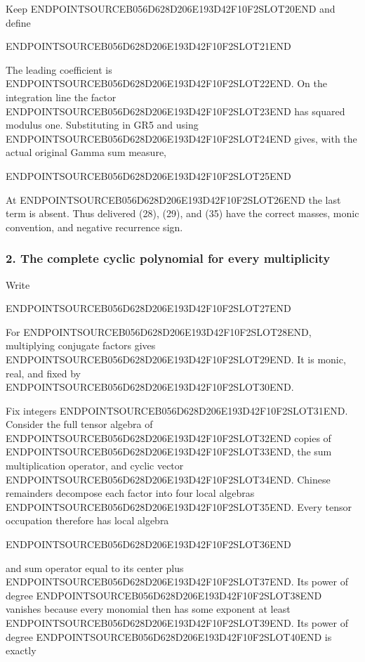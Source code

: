 Keep ENDPOINTSOURCEB056D628D206E193D42F10F2SLOT20END and define

ENDPOINTSOURCEB056D628D206E193D42F10F2SLOT21END

The leading coefficient is ENDPOINTSOURCEB056D628D206E193D42F10F2SLOT22END. On the integration line the factor ENDPOINTSOURCEB056D628D206E193D42F10F2SLOT23END has squared modulus one. Substituting in GR5 and using ENDPOINTSOURCEB056D628D206E193D42F10F2SLOT24END gives, with the actual original Gamma sum measure,

ENDPOINTSOURCEB056D628D206E193D42F10F2SLOT25END

At ENDPOINTSOURCEB056D628D206E193D42F10F2SLOT26END the last term is absent. Thus delivered (28), (29), and (35) have the correct masses, monic convention, and negative recurrence sign.

\subsubsection{2. The complete cyclic polynomial for every multiplicity}\label{endpoint-gamma_review--the-complete-cyclic-polynomial-for-every-multiplicity}

Write

ENDPOINTSOURCEB056D628D206E193D42F10F2SLOT27END

For ENDPOINTSOURCEB056D628D206E193D42F10F2SLOT28END, multiplying conjugate factors gives ENDPOINTSOURCEB056D628D206E193D42F10F2SLOT29END. It is monic, real, and fixed by ENDPOINTSOURCEB056D628D206E193D42F10F2SLOT30END.

Fix integers ENDPOINTSOURCEB056D628D206E193D42F10F2SLOT31END. Consider the full tensor algebra of ENDPOINTSOURCEB056D628D206E193D42F10F2SLOT32END copies of ENDPOINTSOURCEB056D628D206E193D42F10F2SLOT33END, the sum multiplication operator, and cyclic vector ENDPOINTSOURCEB056D628D206E193D42F10F2SLOT34END. Chinese remainders decompose each factor into four local algebras ENDPOINTSOURCEB056D628D206E193D42F10F2SLOT35END. Every tensor occupation therefore has local algebra

ENDPOINTSOURCEB056D628D206E193D42F10F2SLOT36END

and sum operator equal to its center plus ENDPOINTSOURCEB056D628D206E193D42F10F2SLOT37END. Its power of degree ENDPOINTSOURCEB056D628D206E193D42F10F2SLOT38END vanishes because every monomial then has some exponent at least ENDPOINTSOURCEB056D628D206E193D42F10F2SLOT39END. Its power of degree ENDPOINTSOURCEB056D628D206E193D42F10F2SLOT40END is exactly

